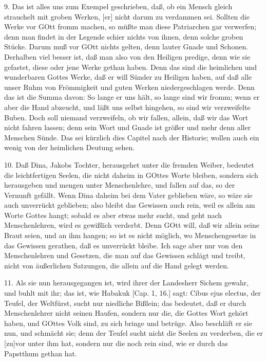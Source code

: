 9. Das ist alles uns zum Exempel geschrieben, daß, ob ein Mensch gleich strauchelt mit groben Werken, [er] nicht darum zu verdammen sei. Sollten die Werke vor GOtt fromm machen, so müßte man diese Patriarchen gar verwerfen; denn man findet in der Legende schier nichts von ihnen, denn solche groben Stücke. Darum muß vor GOtt nichts gelten, denn lauter Gnade und Schonen. Derhalben viel besser ist, daß man also von den Heiligen predige, denn wie sie gefastet, diese oder jene Werke gethan haben. Denn das sind die heimlichen und wunderbaren Gottes Werke, daß er will Sünder zu Heiligen haben, auf daß alle unser Ruhm von Frömmigkeit und guten Werken niedergeschlagen werde. Denn das ist die Summa davon: So lange er uns hält, so lange sind wir fromm; wenn er aber die Hand abzeucht, und läßt uns selbst hingehen, so sind wir verzweifelte Buben. Doch soll niemand verzweifeln, ob wir fallen, allein, daß wir das Wort nicht fahren lassen; denn sein Wort und Gnade ist größer und mehr denn aller Menschen Sünde. Das sei kürzlich dies Capitel nach der Historie; wollen auch ein wenig von der heimlichen Deutung sehen.

10. Daß Dina, Jakobs Tochter, herausgehet unter die fremden Weiber, bedeutet die leichtfertigen Seelen, die nicht daheim in GOttes Worte bleiben, sondern sich herausgeben und mengen unter Menschenlehre, und fallen auf das, so der Vernunft gefällt. Wenn Dina daheim bei dem Vater geblieben wäre, so wäre sie auch unverrückt geblieben; also bleibt das Gewissen auch rein, weil es allein am Worte Gottes hangt; sobald es aber etwas mehr sucht, und geht nach Menschenlehren, wird es gewißlich verderbt. Denn GOtt will, daß wir allein seine Braut seien, und an ihm hangen; so ist es nicht möglich, wo Menschengesetze in das Gewissen gerathen, daß es unverrückt bleibe. Ich sage aber nur von den Menschenlehren und Gesetzen, die man auf das Gewissen schlägt und treibt, nicht von äußerlichen Satzungen, die allein auf die Hand gelegt werden.

11. Als sie nun herausgegangen ist, wird ihrer der Landesherr Sichem gewahr, und buhlt mit ihr; das ist, wie Habakuk [Cap. 1, 16.] sagt: Cibus ejus electus, der Teufel, der Weltfürst, sucht nur niedliche Bißlein; das bedeutet, daß er durch Menschenlehrer nicht seinen Haufen, sondern nur die, die Gottes Wort gehört haben, und GOttes Volk sind, zu sich bringe und betrüge. Also beschläft er sie nun, und schmächt sie; denn der Teufel sucht nicht die Seelen zu verderben, die er [zu]vor unter ihm hat, sondern nur die noch rein sind, wie er durch das Papstthum gethan hat.


